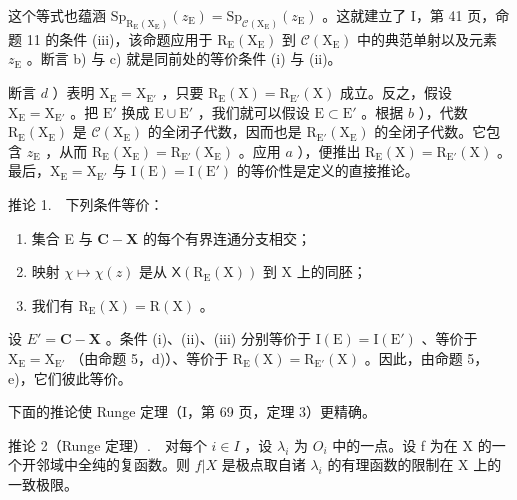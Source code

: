 这个等式也蕴涵 \(\mathrm{Sp}_{\mathrm{R}_{\mathrm{E}}(\mathrm{X}_{\mathrm{E}})}(z_{\mathrm{E}})=\mathrm{Sp}_{\mathcal{C}(\mathrm{X}_{\mathrm{E}})}(z_{\mathrm{E}})\) 。这就建立了 I，第 41 页，命题 11 的条件 (iii)，该命题应用于 \(\mathrm{R}_{\mathrm{E}}(\mathrm{X}_{\mathrm{E}})\) 到 \(\mathcal{C}(\mathrm{X}_{\mathrm{E}})\) 中的典范单射以及元素 \(z_{\mathrm{E}}\) 。断言 b) 与 c) 就是同前处的等价条件 (i) 与 (ii)。

断言 \(d\) ）表明 \(\mathrm{X}_{\mathrm{E}} = \mathrm{X}_{\mathrm{E}'}\) ，只要 \(\mathrm{R}_{\mathrm{E}}(\mathrm{X}) = \mathrm{R}_{\mathrm{E}'}(\mathrm{X})\) 成立。反之，假设 \(\mathrm{X}_{\mathrm{E}} = \mathrm{X}_{\mathrm{E}'}\) 。把 \(\mathrm{E}'\) 换成 \(\mathrm{E} \cup \mathrm{E}'\) ，我们就可以假设 \(\mathrm{E} \subset \mathrm{E}'\) 。根据 \(b\) ），代数 \(\mathrm{R}_{\mathrm{E}}(\mathrm{X}_{\mathrm{E}})\) 是 \(\mathcal{C}(\mathrm{X}_{\mathrm{E}})\) 的全闭子代数，因而也是 \(\mathrm{R}_{\mathrm{E}'}(\mathrm{X}_{\mathrm{E}})\) 的全闭子代数。它包含 \(z_{\mathrm{E}}\) ，从而 \(\mathrm{R}_{\mathrm{E}}(\mathrm{X}_{\mathrm{E}}) = \mathrm{R}_{\mathrm{E}'}(\mathrm{X}_{\mathrm{E}})\) 。应用 \(a\) ），便推出 \(\mathrm{R}_{\mathrm{E}}(\mathrm{X}) = \mathrm{R}_{\mathrm{E}'}(\mathrm{X})\) 。最后，\(\mathrm{X}_{\mathrm{E}} = \mathrm{X}_{\mathrm{E}'}\) 与 \(\mathrm{I}(\mathrm{E}) = \mathrm{I}(\mathrm{E}')\) 的等价性是定义的直接推论。

推论 1.　下列条件等价：

\begin{enumerate}
\def\labelenumi{(\roman{enumi})}
\item
  集合 E 与 \(\mathbf{C} - \mathbf{X}\) 的每个有界连通分支相交；
\item
  映射 \(\chi \mapsto \chi (z)\) 是从 \(\mathsf{X}(\mathrm{R}_{\mathrm{E}}(\mathrm{X}))\) 到 \(\mathrm{X}\) 上的同胚；
\item
  我们有 \(\mathrm{R_E(X)} = \mathrm{R(X)}\) 。
\end{enumerate}

设 \(E' = \mathbf{C} - \mathbf{X}\) 。条件 (i)、(ii)、(iii) 分别等价于 \(\mathrm{I}(\mathrm{E}) = \mathrm{I}(\mathrm{E}')\) 、等价于 \(\mathrm{X}_{\mathrm{E}} = \mathrm{X}_{\mathrm{E}'}\) （由命题 5，d)）、等价于 \(\mathrm{R}_{\mathrm{E}}(\mathrm{X}) = \mathrm{R}_{\mathrm{E}'}(\mathrm{X})\) 。因此，由命题 5，e)，它们彼此等价。

下面的推论使 Runge 定理（I，第 69 页，定理 3）更精确。

推论 2（Runge 定理）.　对每个 \(i \in I\) ，设 \(\lambda_{i}\) 为 \(O_{i}\) 中的一点。设 f 为在 X 的一个开邻域中全纯的复函数。则 \(f|X\) 是极点取自诸 \(\lambda_{i}\) 的有理函数的限制在 X 上的一致极限。

